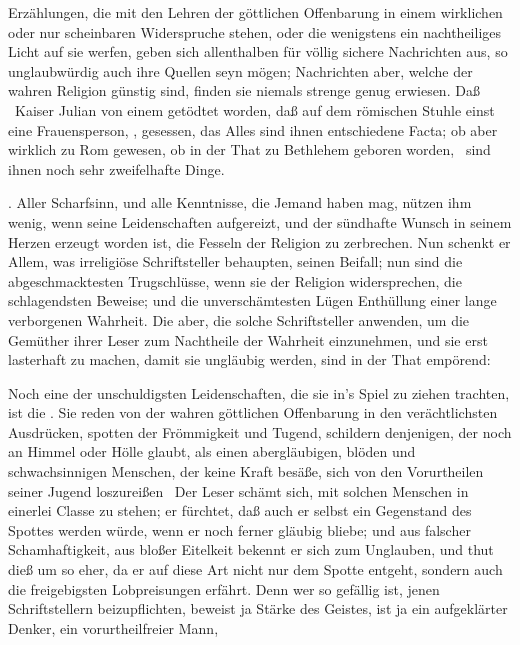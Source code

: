 \begin{aufza}
\begin{aufzb}
\begin{aufzc}
\item Erzählungen, die mit den Lehren der göttlichen Offenbarung in einem wirklichen oder nur scheinbaren Widerspruche stehen, oder die wenigstens ein nachtheiliges Licht auf sie werfen, geben sich allenthalben für völlig sichere Nachrichten aus, so unglaubwürdig auch ihre Quellen seyn mögen; Nachrichten aber, welche der wahren Religion günstig sind, finden sie niemals strenge genug erwiesen. Daß \zB\ Kaiser Julian von einem  getödtet worden, daß auf dem römischen Stuhle einst eine Frauensperson, , gesessen, das Alles sind ihnen entschiedene Facta; ob aber  wirklich zu Rom gewesen, ob  in der That zu Bethlehem geboren worden, \udgl\ sind ihnen noch sehr zweifelhafte Dinge.
\end{aufzc}
\item {}. Aller Scharfsinn, und alle Kenntnisse, die Jemand haben mag, nützen ihm wenig, wenn seine Leidenschaften aufgereizt, und der sündhafte Wunsch in seinem Herzen erzeugt worden ist, die Fesseln der Religion zu zerbrechen. Nun schenkt er Allem, was irreligiöse Schriftsteller behaupten, seinen Beifall; nun sind die abgeschmacktesten Trugschlüsse, wenn sie der Religion widersprechen, die schlagendsten Beweise; und die unverschämtesten Lügen Enthüllung einer lange verborgenen Wahrheit. Die  aber, die solche Schriftsteller anwenden, um die Gemüther ihrer Leser zum Nachtheile der Wahrheit einzunehmen, und sie erst lasterhaft zu machen, damit sie ungläubig werden, sind in der That empörend:
\begin{aufzc}
\item Noch eine der unschuldigsten Leidenschaften, die sie in's Spiel zu ziehen trachten, ist die . Sie reden von der wahren göttlichen Offenbarung in den verächtlichsten Ausdrücken, spotten der Frömmigkeit und Tugend, schildern denjenigen, der noch an Himmel oder Hölle glaubt, als einen abergläubigen, blöden und schwachsinnigen Menschen, der keine Kraft besäße, sich von den Vorurtheilen seiner Jugend loszureißen \usw\ Der Leser schämt sich, mit solchen Menschen in einerlei Classe zu stehen; er fürchtet, daß auch er selbst ein Gegenstand des Spottes werden würde, wenn er noch ferner gläubig bliebe; und aus falscher Schamhaftigkeit, aus bloßer Eitelkeit bekennt er sich zum Unglauben, und thut dieß um so eher, da er auf diese Art nicht nur dem Spotte entgeht, sondern auch die freigebigsten Lobpreisungen erfährt. Denn wer so gefällig ist, jenen Schriftstellern beizupflichten, beweist ja Stärke des Geistes, ist ja ein aufgeklärter Denker, ein vorurtheilfreier Mann, \usw\

\end{aufzc}
\end{aufzb}
\end{aufza}
